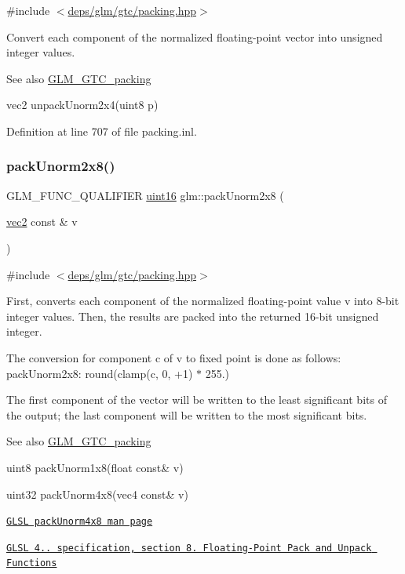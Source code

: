 {\ttfamily \#include $<$\hyperlink{gtc_2packing_8hpp}{deps/glm/gtc/packing.\+hpp}$>$}

Convert each component of the normalized floating-\/point vector into unsigned integer values.

\begin{DoxySeeAlso}{See also}
\hyperlink{group__gtc__packing}{G\+L\+M\+\_\+\+G\+T\+C\+\_\+packing} 

vec2 unpack\+Unorm2x4(uint8 p) 
\end{DoxySeeAlso}


Definition at line 707 of file packing.\+inl.

\mbox{\label{group__gtc__packing_ga833288fc0d4a79f19d0db75a6843bfe6}} 
\subsubsection{\texorpdfstring{pack\+Unorm2x8()}{packUnorm2x8()}}
{\footnotesize\ttfamily G\+L\+M\+\_\+\+F\+U\+N\+C\+\_\+\+Q\+U\+A\+L\+I\+F\+I\+ER \hyperlink{group__gtc__type__precision_gad8c2939e1fdd8e5828b31d95c52255d5}{uint16} glm\+::pack\+Unorm2x8 (\begin{DoxyParamCaption}\item[{\hyperlink{group__core__types_gaa1618f51db67eaa145db101d8c8431d8}{vec2} const \&}]{v }\end{DoxyParamCaption})}



{\ttfamily \#include $<$\hyperlink{gtc_2packing_8hpp}{deps/glm/gtc/packing.\+hpp}$>$}

First, converts each component of the normalized floating-\/point value v into 8-\/bit integer values. Then, the results are packed into the returned 16-\/bit unsigned integer.

The conversion for component c of v to fixed point is done as follows\+: pack\+Unorm2x8\+: round(clamp(c, 0, +1) $\ast$ 255.)

The first component of the vector will be written to the least significant bits of the output; the last component will be written to the most significant bits.

\begin{DoxySeeAlso}{See also}
\hyperlink{group__gtc__packing}{G\+L\+M\+\_\+\+G\+T\+C\+\_\+packing} 

uint8 pack\+Unorm1x8(float const\& v) 

uint32 pack\+Unorm4x8(vec4 const\& v) 

\href{http://www.opengl.org/sdk/docs/manglsl/xhtml/packUnorm4x8.xml}{\tt G\+L\+SL pack\+Unorm4x8 man page} 

\href{http://www.opengl.org/registry/doc/GLSLangSpec.4.20.8.pdf}{\tt G\+L\+SL 4.. specification, section 8. Floating-\/\+Point Pack and Unpack Functions} 
\end{DoxySeeAlso}


